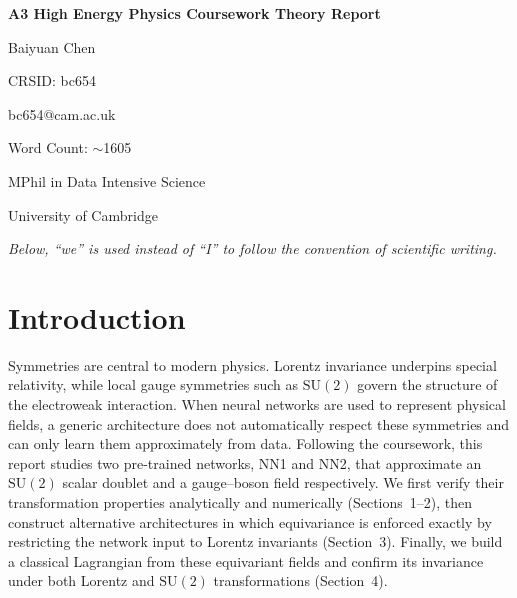 \documentclass[10pt,leqno]{amsart}
\begin{document}
\begin{titlepage}
\centering
\vspace*{2cm}

{\LARGE \bfseries A3 High Energy Physics Coursework Theory Report\par}

\vspace{1.5cm}

{\large Baiyuan Chen\par}
\vspace{0.3cm}
{\large CRSID: bc654\par}
\vspace{0.3cm}
{\large bc654@cam.ac.uk\par}

\vspace{1.5cm}

{\large Word Count: $\sim$1605\par}

\vspace{1.5cm}

{\large MPhil in Data Intensive Science\par}
\vspace{0.3cm}
{\large University of Cambridge\par}
\vspace{1.5cm}

{\small\textit{Below, ``we'' is used instead of ``I'' to follow the convention of scientific writing.}\par}

\vfill
\end{titlepage}

\setcounter{section}{-1}
\section{Introduction}

Symmetries are central to modern physics. Lorentz invariance underpins
special relativity, while local gauge symmetries such as $\mathrm{SU}(2)$
govern the structure of the electroweak interaction. When neural networks 
are used to represent physical fields, a generic architecture does not 
automatically respect these symmetries and can only learn them approximately 
from data. Following the coursework, this report studies two pre-trained networks,
NN1 and NN2, that approximate an $\mathrm{SU}(2)$ scalar doublet and a
gauge--boson field respectively. We first verify their transformation
properties analytically and numerically (Sections~1--2), then construct
alternative architectures in which equivariance is enforced exactly by
restricting the network input to Lorentz invariants (Section~3). Finally,
we build a classical Lagrangian from these equivariant fields and confirm
its invariance under both Lorentz and $\mathrm{SU}(2)$ transformations
(Section~4).
\end{document}

